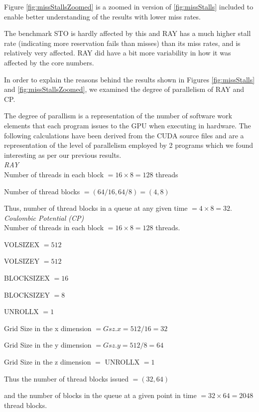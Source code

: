 Figure \ref{fig:missStallsZoomed} is a zoomed in version of \ref{fig:missStalls} included to enable better understanding of the results with lower miss rates. 

The benchmark STO is hardly affected by this and RAY has a much higher stall rate (indicating more reservation fails than misses) than its miss rates, and is relatively very affected. RAY did have a bit more variability in how it was affected by the core numbers.

In order to explain the reasons behind the results shown in Figures \ref{fig:missStalls} and \ref{fig:missStallsZoomed}, we examined the degree of parallelism of RAY and CP.

The degree of parallism is a representation of the number of software work elements that each program issues to the GPU when executing in hardware. The following calculations have been derived from the CUDA source files and are a representation of the level of parallelism employed by 2 programs which we found interesting as per our previous results. \\

\emph{RAY}\\

Number of threads in each block $= 16 \times 8 = 128$ threads

Number of thread blocks $= (64/16, 64/8) = (4,8)$

Thus, number of thread blocks in a queue at any given time $= 4 \times 8 = 32.$
\\

\emph{Coulombic Potential (CP)}\\

Number of threads in each block $= 16 \times 8 = 128$ threads.

VOLSIZEX $= 512$

VOLSIZEY $= 512$

BLOCKSIZEX $= 16$

BLOCKSIZEY $= 8$

UNROLLX  $= 1$

Grid Size in the x dimension $= Gsz.x = 512/16 = 32$

Grid Size in the y dimension $= Gsz.y = 512/8 = 64$

Grid Size in the z dimension $=$ UNROLLX $= 1$

Thus the number of thread blocks issued $= (32, 64)$

and the number of blocks in the queue at a given point in time $= 32 \times 64 = 2048$ thread blocks.

